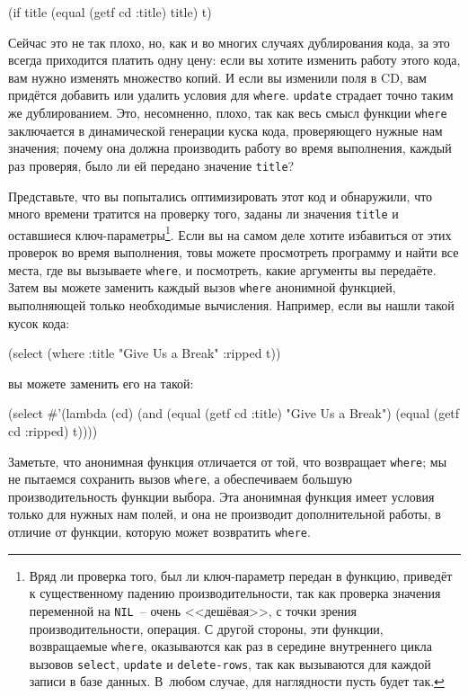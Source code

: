 \begin{myverb}
(if title (equal (getf cd :title) title) t)
\end{myverb}

Сейчас это не так плохо, но, как и во многих случаях дублирования кода, за это всегда
приходится платить одну цену: если вы хотите изменить работу этого кода, вам нужно
изменять множество копий. И если вы изменили поля в CD, вам придётся добавить или удалить
условия для \lstinline{where}. \lstinline{update} страдает точно таким же дублированием. Это,
несомненно, плохо, так как весь смысл функции \lstinline{where} заключается в динамической
генерации куска кода, проверяющего нужные нам значения; почему она должна производить
работу во время выполнения, каждый раз проверяя, было ли ей передано значение
\lstinline{title}?

Представьте, что вы попытались оптимизировать этот код и обнаружили, что много времени
тратится на проверку того, заданы ли значения \lstinline{title} и оставшиеся
ключ-параметры\footnote{Вряд ли проверка того, был ли ключ-параметр передан в функцию,
  приведёт к существенному падению производительности, так как проверка значения
  переменной на \lstinline{NIL}~-- очень <<дешёвая>>, с точки зрения производительности, операция. С
  другой стороны, эти функции, возвращаемые \lstinline{where}, оказываются как раз в середине
  внутреннего цикла вызовов \lstinline{select}, \lstinline{update} и \lstinline{delete-rows}, так как
  вызываются для каждой записи в базе данных. В~любом случае, для наглядности пусть будет
  так.}. Если вы на самом деле хотите избавиться от этих проверок во время выполнения, товы
можете просмотреть программу и найти все места, где вы вызываете \lstinline{where}, и
посмотреть, какие аргументы вы передаёте. Затем вы можете заменить каждый вызов
\lstinline{where} анонимной функцией, выполняющей только необходимые вычисления. Например, если
вы нашли такой кусок кода:

\begin{myverb}
(select (where :title "Give Us a Break" :ripped t))
\end{myverb}

\noindent{}вы можете заменить его на такой:

\begin{myverb}
(select
 #'(lambda (cd)
     (and (equal (getf cd :title) "Give Us a Break")
          (equal (getf cd :ripped) t))))
\end{myverb}

Заметьте, что анонимная функция отличается от той, что возвращает \lstinline{where}; мы не
пытаемся сохранить вызов \lstinline{where}, а обеспечиваем большую производительность функции
выбора. Эта анонимная функция имеет условия только для нужных нам полей, и она не
производит дополнительной работы, в отличие от функции, которую может возвратить
\lstinline{where}.


